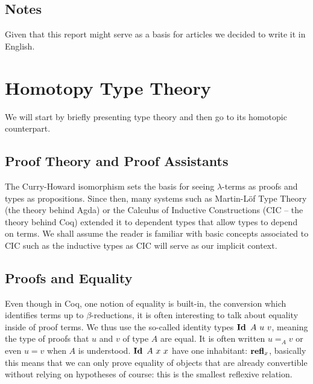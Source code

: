 \documentclass[11pt]{article}
\theoremstyle{plain}
\theoremstyle{remark}
\begin{document}
\subsection*{Notes}

Given that this report might serve as a basis for articles we decided to write
it in English.

\newpage
\pagestyle{plain} %

\section{Homotopy Type Theory}

We will start by briefly presenting type theory and then go to its homotopic
counterpart.

\subsection{Proof Theory and Proof Assistants}

The Curry-Howard isomorphism sets the basis for seeing $\lambda$-terms as
proofs and types as propositions. Since then, many systems such as
Martin-L\" of Type Theory (the theory behind Agda) or the Calculus of
Inductive Constructions (CIC -- the theory behind Coq) extended it to dependent
types that allow types to depend on terms.
We shall assume the reader is familiar with basic concepts associated to CIC
such as the inductive types as CIC will serve as our implicit context.

\subsection{Proofs and Equality}

Even though in Coq, one notion of equality is built-in, the conversion which
identifies terms up to $\beta$-reductions, it is often interesting to talk
about equality inside of proof terms.
We thus use the so-called identity types $\Id\ A\ u\ v$, meaning the type of
proofs that $u$ and $v$ of type $A$ are equal. It is often written
$u =_A v$ or even $u = v$ when $A$ is understood.
$\operatorname{\mathbf{Id}}\ A\ x\ x$ have one inhabitant: $\operatorname{\mathbf{refl}}_x$,
basically this means that we can only prove equality of objects that are already
convertible without relying on hypotheses of course: this is the smallest
reflexive relation.
\end{document}
